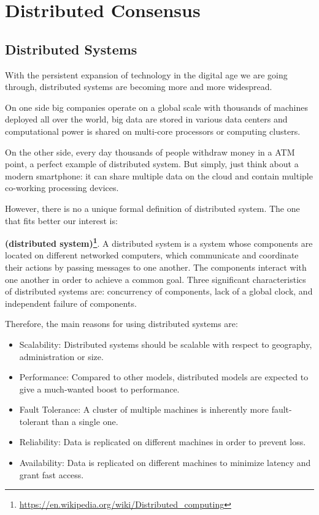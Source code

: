 \chapter{Distributed Consensus}
\label{chpr:consensus}

\bigskip
\section{Distributed Systems}
With the persistent expansion of technology in the digital age we are going through, distributed systems are becoming more and more widespread.

\bigskip
\noindent
On one side big companies operate on a global scale with thousands of machines deployed all over the world, big data are stored in various data centers and computational power is shared on multi-core processors or computing clusters.

\bigskip
\noindent
On the other side, every day thousands of people withdraw money in a ATM point, a perfect example of distributed system. But simply, just think about a modern smartphone: it can share multiple data on the cloud and contain multiple co-working processing devices.

\bigskip
\noindent
However, there is no a unique formal definition of distributed system. The one that fits better our interest is:
\begin{mydef} {\bf (distributed system)\footnote{\url{https://en.wikipedia.org/wiki/Distributed_computing}}}.
    A distributed system is a system whose components are located on different networked computers, which communicate and coordinate their actions by passing messages to one another. The components interact with one another in order to achieve a common goal. Three significant characteristics of distributed systems are: concurrency of components, lack of a global clock, and independent failure of components.
\end{mydef}

\bigskip
\noindent
Therefore, the main reasons for using distributed systems are:
\begin{itemize}
    \item Scalability: Distributed systems should be scalable with respect to geography, administration or size.
    \item Performance: Compared to other models, distributed models are expected to give a much-wanted boost to performance.
    \item Fault Tolerance: A cluster of multiple machines is inherently more fault-tolerant than a single one.
    \item Reliability: Data is replicated on different machines in order to prevent loss.
    \item Availability: Data is replicated on different machines to minimize latency and grant fast access.
\end{itemize}

